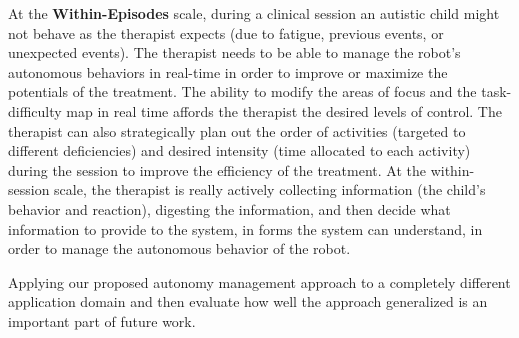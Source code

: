At the \textbf{Within-Episodes} scale, during a clinical session an autistic child might not behave as the therapist expects (due to fatigue, previous events, or unexpected events). The therapist needs to be able to manage the robot's autonomous behaviors in real-time in order to improve or maximize the potentials of the treatment. The ability to modify the areas of focus and the task-difficulty map in real time affords the therapist the desired levels of control. The therapist can also strategically plan out the order of activities (targeted to different deficiencies) and desired intensity (time allocated to each activity) during the session to improve the efficiency of the treatment. At the within-session scale, the therapist is really actively collecting information (the child's behavior and reaction), digesting the information, and then decide what information to provide to the system, in forms the system can understand, in order to manage the autonomous behavior of the robot.

Applying our proposed autonomy management approach to a completely different application domain and then evaluate how well the approach generalized is an important part of future work.